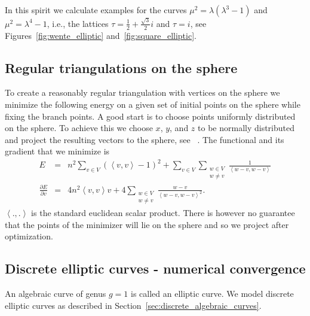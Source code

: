 \documentclass[Thesis]{subfiles}
\begin{document}
In this spirit we calculate examples for the curves $\mu^2=\lambda(\lambda^3-1)$ and $\mu^2=\lambda^4-1$, i.e., the lattices $\tau=\frac{1}{2}+\frac{\sqrt 3}{2}i$ and $\tau=i$, see Figures~\ref{fig:wente_elliptic} and~\ref{fig:square_elliptic}.

\subsection{Regular triangulations on the sphere}
\label{sec:spherical_triangulations}

To create a reasonably regular triangulation with vertices on the sphere we minimize the following energy on a given set of initial points on the sphere while fixing the branch points. 
A good start is to choose points uniformly distributed on the sphere. 
To achieve this we choose $x$, $y$, and $z$ to be normally distributed and project the resulting vectors to the sphere, see~ \cite{Muller1959}. 
The functional and its gradient that we minimize is
\begin{eqnarray*}
E &=& n^2\sum_{v\in V}\left( \left<v,v\right> - 1\right)^2 + \sum_{v\in V}\sum_{\substack{w\in V\\w\neq v}} \frac{1}{\left<w-v, w-v\right>}\\ 
\frac{\partial E}{\partial v} &=& 4n^2\left<v,v\right>v + 4\sum_{\substack{w\in V\\w\neq v}}\frac{w-v}{\left<w-v,w-v\right>^2}.
\end{eqnarray*}
$\left<.,.\right>$ is the standard euclidean scalar product. There is however no guarantee that the points of the minimizer will lie on the sphere and so we project after optimization.

\subsection{Discrete elliptic curves - numerical convergence}
\label{sec:numerical_convergence}

An algebraic curve of genus $g=1$ is called an elliptic curve. We model discrete elliptic curves as described in Section~\ref{sec:discrete_algebraic_curves}.
\end{document}
